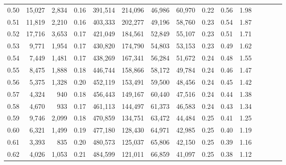 \begin{tabular}{rrrcrrrrrrrrrrr}
0.50 &  15,027 &  2,834 &                                       0.16 &  391,514 &  214,096 &   46,986 &   60,970 &  0.22 &  0.56 &                         1.98 \\
0.51 &  11,819 &  2,210 &                                       0.16 &  403,333 &  202,277 &   49,196 &   58,760 &  0.23 &  0.54 &                         1.87 \\
0.52 &  17,716 &  3,653 &                                       0.17 &  421,049 &  184,561 &   52,849 &   55,107 &  0.23 &  0.51 &                         1.71 \\
0.53 &   9,771 &  1,954 &                                       0.17 &  430,820 &  174,790 &   54,803 &   53,153 &  0.23 &  0.49 &                         1.62 \\
0.54 &   7,449 &  1,481 &                                       0.17 &  438,269 &  167,341 &   56,284 &   51,672 &  0.24 &  0.48 &                         1.55 \\
0.55 &   8,475 &  1,888 &                                       0.18 &  446,744 &  158,866 &   58,172 &   49,784 &  0.24 &  0.46 &                         1.47 \\
0.56 &   5,375 &  1,328 &                                       0.20 &  452,119 &  153,491 &   59,500 &   48,456 &  0.24 &  0.45 &                         1.42 \\
0.57 &   4,324 &    940 &                                       0.18 &  456,443 &  149,167 &   60,440 &   47,516 &  0.24 &  0.44 &                         1.38 \\
0.58 &   4,670 &    933 &                                       0.17 &  461,113 &  144,497 &   61,373 &   46,583 &  0.24 &  0.43 &                         1.34 \\
0.59 &   9,746 &  2,099 &                                       0.18 &  470,859 &  134,751 &   63,472 &   44,484 &  0.25 &  0.41 &                         1.25 \\
0.60 &   6,321 &  1,499 &                                       0.19 &  477,180 &  128,430 &   64,971 &   42,985 &  0.25 &  0.40 &                         1.19 \\
0.61 &   3,393 &    835 &                                       0.20 &  480,573 &  125,037 &   65,806 &   42,150 &  0.25 &  0.39 &                         1.16 \\
0.62 &   4,026 &  1,053 &                                       0.21 &  484,599 &  121,011 &   66,859 &   41,097 &  0.25 &  0.38 &                         1.12 \\

\end{tabular}
